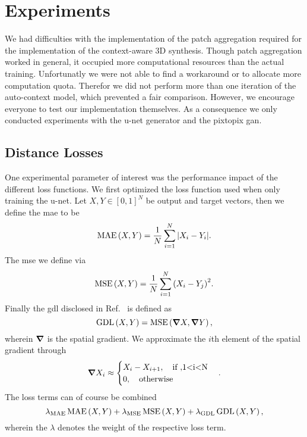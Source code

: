 \section{Experiments}

We had difficulties with the implementation of the patch aggregation required
for the implementation of the context-aware 3D synthesis. Though patch
aggregation worked in general, it occupied more computational resources than
the actual training. Unfortunatly we were not able to find a workaround or to
allocate more computation quota. Therefor we did not perform more than one
iteration of the auto-context model, which prevented a fair comparison.
However, we encourage everyone to test our implementation themselves.
As a consequence we only conducted experiments with the u-net generator and
the pixtopix \gls{gan}.

\subsection{Distance Losses}

One experimental parameter of interest was the performance impact of the
different loss functions. We first optimized the loss function used when
only training the u-net. Let $X,Y\in{[0,1]}^N$ be output and target vectors,
then we define the \gls{mae} to be
\begin{equation}
  \operatorname{MAE}\left(X,Y\right)
  =
  \frac{1}{N}\sum_{i=1}^N
  \abs{X_i-Y_i}
  \label{eq:mae}.
\end{equation}
The \gls{mse} we define via
\begin{equation}
  \operatorname{MSE}\left(X,Y\right)
  =
  \frac{1}{N}\sum_{i=1}^N
  {\left(X_i-Y_j\right)}^2
  \label{eq:mse}.
\end{equation}
Finally the \gls{gdl} disclosed in Ref.~\cite{Nie16} is defined as
\begin{equation}
  \operatorname{GDL}\left(X,Y\right)
  =
  \operatorname{MSE}\left(\grad X,\grad Y\right)
  \label{eq:gdl},
\end{equation}
wherein $\grad$ is the spatial gradient. We approximate the $i$th element
of the spatial gradient through
\begin{equation}
  \grad X_i
  \approx
  \begin{cases}
    X_i-X_{i+1}\qc\text{if }, $1<i<N$\\
    0\qc\text{otherwise}
  \end{cases}
  \label{eq:grad}.
\end{equation}
The loss terms can of course be combined
\begin{equation}
  \lambda_\text{MAE}\operatorname{MAE}\left(X,Y\right)
  +
  \lambda_\text{MSE}\operatorname{MSE}\left(X,Y\right)
  +
  \lambda_\text{GDL}\operatorname{GDL}\left(X,Y\right),
\end{equation}
wherein the $\lambda$ denotes the weight of the respective loss term.

